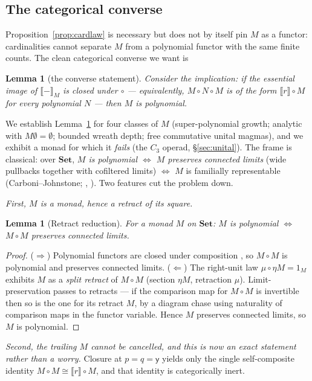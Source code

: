 \documentclass[11pt]{amsart}
\theoremstyle{plain}
\newtheorem{lemma}[theorem]{Lemma}
\theoremstyle{definition}
\newcommand{\Set}{\mathbf{Set}}
\newcommand{\ext}[1]{\llbracket #1 \rrbracket}
\newcommand{\extM}[1]{\llbracket #1 \rrbracket_{M}}
\newcommand{\y}{\mathsf{y}}
\begin{document}
\subsection{The categorical converse}\label{sec:converse}
Proposition~\ref{prop:cardlaw} is necessary but does not by itself pin $M$ as a functor: cardinalities
cannot separate $M$ from a polynomial functor with the same finite counts. The clean categorical
converse we want is

\begin{lemma}[the converse statement]\label{lem:N}
Consider the implication: if the essential image of $\extM{-}$ is closed under $\circ$ ---
equivalently, $M\circ N\circ M$ is of the form $\ext{r}\circ M$ for every polynomial $N$ --- then $M$
is polynomial.
\end{lemma}

We establish Lemma~\ref{lem:N} for four classes of $M$ (super-polynomial growth; analytic with
$M\emptyset=\emptyset$; bounded wreath depth; free commutative unital magmas), and we exhibit a monad
for which it \emph{fails} (the $C_3$ operad, \S\ref{sec:unital}). The frame is classical: over $\Set$,
\emph{$M$ is polynomial $\iff$ $M$ preserves connected limits} (wide pullbacks together with
cofiltered limits) $\iff$ $M$ is familially representable (Carboni--Johnstone; \cite[\S1]{GambinoKock},
\cite{NiuSpivak}). Two features cut the problem down.

\emph{First, $M$ is a monad, hence a retract of its square.}

\begin{lemma}[Retract reduction]\label{lem:R0}
For a monad $M$ on $\Set$: $M$ is polynomial $\iff$ $M\circ M$ preserves connected limits.
\end{lemma}

\begin{proof}
($\Rightarrow$) Polynomial functors are closed under composition \cite{GambinoKock}, so $M\circ M$ is
polynomial and preserves connected limits. ($\Leftarrow$) The right-unit law $\mu\circ\eta M=1_M$
exhibits $M$ as a \emph{split retract} of $M\circ M$ (section $\eta M$, retraction $\mu$).
Limit-preservation passes to retracts --- if the comparison map for $M\circ M$ is invertible then so
is the one for its retract $M$, by a diagram chase using naturality of comparison maps in the functor
variable. Hence $M$ preserves connected limits, so $M$ is polynomial.
\end{proof}

\emph{Second, the trailing $M$ cannot be cancelled, and this is now an exact statement rather than a
worry.} Closure at $p=q=\y$ yields only the single self-composite identity $M\circ M\cong\ext{r}\circ
M$, and that identity is categorically inert.
\end{document}
